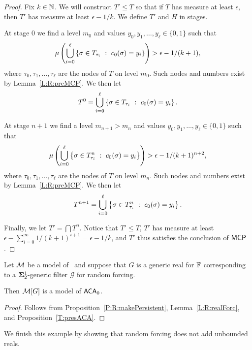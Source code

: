 \begin{proof}
Fix $k\in\mathbb{N}$.
We will construct $T'\leq T$ so that if $T$ has measure
at least $\epsilon$, then $T'$ has measure at least $\epsilon-1/k$.
We define $T'$ and $H$ in stages.

At stage $0$ we find a level $m_0$ and values $y_0,y_1,\ldots,y_\ell\in\{0,1\}$ such that
$$\mu\left(\bigcup_{i=0}^\ell\left\{\sigma\in T_{\tau_i}\ :\ c_0(\sigma)=y_i\right\}\right)>\epsilon-1/(k+1),$$
where $\tau_0,\tau_1,\ldots,\tau_\ell$ are the nodes of $T$ on level $m_0$.
Such nodes and numbers exist by Lemma~\ref{L:R:preMCP}.
We then let
$$T^0=\bigcup_{i=0}^\ell\left\{\sigma\in T_{\tau_i}\ :\ c_0(\sigma)=y_i\right\}.$$

At stage $n+1$ we find a level $m_{n+1}>m_n$ and values $y_0,y_1,\ldots,y_\ell\in\{0,1\}$ such that
$$\mu\left(\bigcup_{i=0}^\ell\left\{\sigma\in T^n_{\tau_i}\ :\ c_0(\sigma)=y_i\right\}\right)>\epsilon-1/(k+1)^{n+2},$$
where $\tau_0,\tau_1,\ldots,\tau_\ell$ are the nodes of $T$ on level $m_n$.
Such nodes and numbers exist by Lemma~\ref{L:R:preMCP}.
We then let
$$T^{n+1}=\bigcup_{i=0}^\ell\left\{\sigma\in T^n_{\tau_i}\ :\ c_0(\sigma)=y_i\right\}.$$

Finally, we let $T'=\bigcap T^n$.
Notice that $T'\leq T$, $T'$ has measure at least
$\epsilon-\sum_{i=0}^\infty1/(k+1)^{i+1}=\epsilon-1/k$,
and $T'$ thus satisfies the conclusion of $\mathsf{MCP}$.
\end{proof}

\begin{thm}
Let $\mathcal{M}$ be a model of \ACAo\
and suppose that $G$ is a generic real for $\mathbb{F}$
corresponding to a $\mathbf{\Sigma}^1_2$-generic filter $\mathcal{G}$ for random forcing.

Then $\mathcal{M}[G]$ is a model of $\mathsf{ACA}_0$.
\end{thm}
\begin{proof}
Follows from Proposition~\ref{P:R:makePersistent}, Lemma~\ref{L:R:realForc}, and Proposition~\ref{T:presACA}.
\end{proof}

We finish this example by showing that random
forcing does not add unbounded reals.

